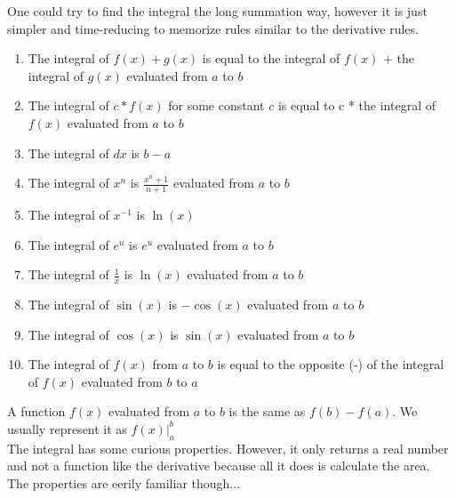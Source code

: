 \documentclass[../revisedmain.tex]{subfiles}
\begin{document}
One could try to find the integral the long summation way, however it is just simpler and time-reducing to memorize rules similar to the derivative rules.
\begin{enumerate}
	\item The integral of $f(x)+g(x)$ is equal to the integral of $f(x)$ + the integral of $g(x)$ evaluated from $a$ to $b$
	\item The integral of $c*f(x)$ for some constant $c$ is equal to c * the integral of $f(x)$ evaluated from $a$ to $b$
	\item The integral of $dx$ is $b-a$
	\item The integral of $x^n$ is $\displaystyle\frac{x^n+1}{n+1}$ evaluated from $a$ to $b$
	\item The integral of $x^{-1}$ is $\ln(x)$
	\item The integral of $e^u$ is $e^u$ evaluated from $a$ to $b$
	\item The integral of $\displaystyle\frac{1}{x}$ is $\ln(x)$ evaluated from $a$ to $b$
	\item The integral of $\sin(x)$ is $-\cos(x)$ evaluated from $a$ to $b$
	\item The integral of $\cos(x)$ is $\sin(x)$ evaluated from $a$ to $b$
	\item The integral of $f(x)$ from $a$ to $b$ is equal to the opposite (-) of the integral of $f(x)$ evaluated from $b$ to $a$
\end{enumerate}
A function $f(x)$ evaluated from $a$ to $b$ is the same as $f(b)-f(a)$. We usually represent it as $f(x)\Big|_a^b$ \\The integral has some curious properties. However, it only returns a real number and not a function like the derivative because all it does is calculate the area.	The properties are eerily familiar though...\\
\end{document}
